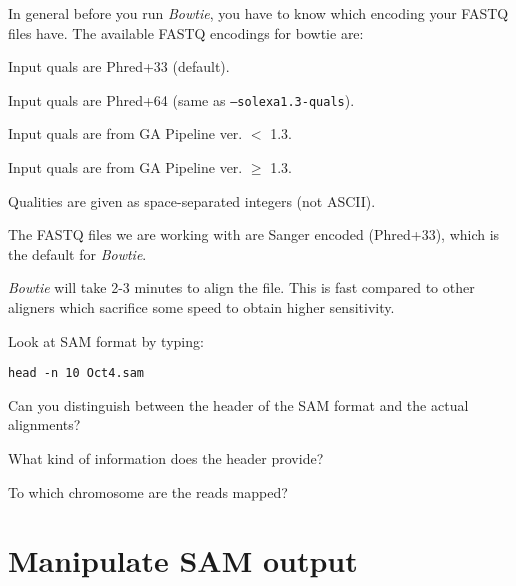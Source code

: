 \begin{note}
In general before you run \emph{Bowtie}, you have to know which encoding your FASTQ files
have. The available FASTQ encodings for bowtie are:

\begin{description}[style=multiline,labelindent=0cm,align=right,leftmargin=\descriptionlabelspace,rightmargin=1.5cm,font=\ttfamily]
 \item[--phred33-quals] Input quals are Phred+33 (default).
 \item[--phred64-quals] Input quals are Phred+64 (same as \texttt{--solexa1.3-quals}).
 \item[--solexa-quals] Input quals are from GA Pipeline ver. $<$ 1.3.
 \item[--solexa1.3-quals] Input quals are from GA Pipeline ver. $\geq$ 1.3.
 \item[--integer-quals] Qualities are given as space-separated integers (not ASCII).
\end{description}

The FASTQ files we are working with are Sanger encoded (Phred+33), which is the
default for \emph{Bowtie}.

\emph{Bowtie} will take 2-3 minutes to align the file. This is fast compared to
other aligners which sacrifice some speed to obtain higher sensitivity.
\end{note}

\begin{steps}
Look at SAM format by typing:

\begin{lstlisting}
head -n 10 Oct4.sam
\end{lstlisting}
\end{steps}

\begin{questions}
Can you distinguish between the header of the SAM format and the actual alignments?
\begin{answer}
\end{answer}

What kind of information does the header provide?
\begin{answer}
\end{answer}

To which chromosome are the reads mapped? 
\begin{answer}
\end{answer}
\end{questions}

\section{Manipulate SAM output}

